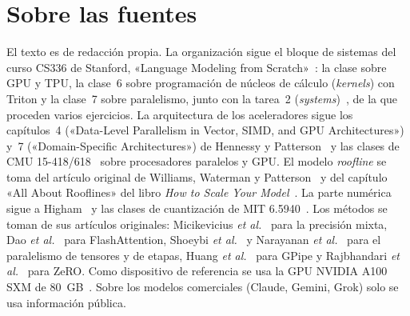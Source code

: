 \documentclass[11pt,a4paper,twoside,openany]{book}
\begin{document}
\section*{Sobre las fuentes}
El texto es de redacción propia. La organización sigue el bloque de sistemas del curso CS336 de Stanford, «Language Modeling from Scratch»~\cite{cs336}: la clase sobre GPU y TPU, la clase~6 sobre programación de núcleos de cálculo (\emph{kernels}) con Triton y la clase~7 sobre paralelismo, junto con la tarea~2 (\emph{systems})~\cite{cs336a2}, de la que proceden varios ejercicios. La arquitectura de los aceleradores sigue los capítulos~4 («Data-Level Parallelism in Vector, SIMD, and GPU Architectures») y~7 («Domain-Specific Architectures») de Hennessy y Patterson~\cite{hp} y las clases de CMU 15-418/618~\cite{cmu418} sobre procesadores paralelos y GPU. El modelo \emph{roofline} se toma del artículo original de Williams, Waterman y Patterson~\cite{roofline} y del capítulo «All About Rooflines» del libro \emph{How to Scale Your Model}~\cite{scaling}. La parte numérica sigue a Higham~\cite{higham} y las clases de cuantización de MIT 6.5940~\cite{mit65940}. Los métodos se toman de sus artículos originales: Micikevicius \emph{et al.}~\cite{micikevicius} para la precisión mixta, Dao \emph{et al.}~\cite{flash} para FlashAttention, Shoeybi \emph{et al.}~\cite{megatron} y Narayanan \emph{et al.}~\cite{narayanan} para el paralelismo de tensores y de etapas, Huang \emph{et al.}~\cite{gpipe} para GPipe y Rajbhandari \emph{et al.}~\cite{zero} para ZeRO. Como dispositivo de referencia se usa la GPU NVIDIA A100 SXM de 80~GB~\cite{a100}. Sobre los modelos comerciales (Claude, Gemini, Grok) solo se usa información pública.
\end{document}
